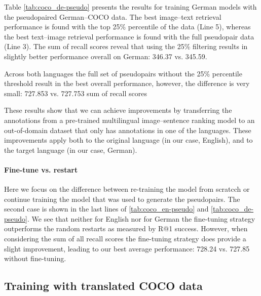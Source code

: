 Table \ref{tab:coco_de-pseudo} presents the results for training German models with the pseudopaired German--COCO data. The best image--text retrieval performance is found with the top 25\% percentile of the data (Line 5), whereas the best text--image retrieval performance is found with the full pseudopair data (Line 3). The sum of recall scores reveal that using
the 25\% filtering results in slightly better performance overall on German: 
346.37 vs. 345.59.

Across both languages the full set of pseudopairs without the 25\% percentile threshold 
result in the best overall performance, however, the difference is very small: 
727.853 vs. 727.753 sum of recall scores 

These results show that we can achieve improvements by transferring the annotations from a pre-trained multilingual image--sentence ranking model to an out-of-domain dataset that only has annotations in one of the languages. These improvements apply both to the original language (in our case, English), and to the target language (in our case, German).

\paragraph{Fine-tune vs. restart}
Here we focus on the difference between re-training the model from scratcch or continue 
training the model that was used to generate the pseudopairs. The second
case is shown in the last lines of  \ref{tab:coco_en-pseudo} and 
\ref{tab:coco_de-pseudo}. We see that neither for English nor for German the fine-tuning 
strategy outperforms the random restarts as measured by R@1 success. However, 
when considering the sum of all recall scores the fine-tuning strategy does provide
a slight improvement, leading to our best average performance: 728.24 vs. 727.85 without
fine-tuning.

\subsection{Training with translated COCO data}

